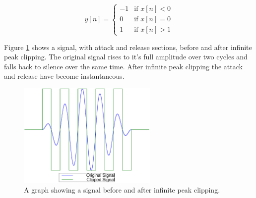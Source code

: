 			\begin{equation}
				y[n] = \begin{cases}
					-1 & \text{if $x[n] < 0$} \\
					0 & \text{if $x[n] = 0$} \\
					1 & \text{if $x[n] > 1$}
				\end{cases}
				\label{eq:InfinitePeakClipper}
			\end{equation}
			
			Figure \ref{fig:InfinitePeakClipping} shows a signal, with attack and release sections, before and
			after infinite peak clipping. The original signal rises to it's full amplitude over two cycles and
			falls back to silence over the same time. After infinite peak clipping the attack and release have
			become instantaneous.

			\begin{figure}[h!]
				\centering
				\includegraphics[width=0.6\textwidth]{chapter3/Images/InfinitePeakClipping.eps}
				\caption{A graph showing a signal before and after infinite peak clipping.}
				\label{fig:InfinitePeakClipping}
			\end{figure}

			

